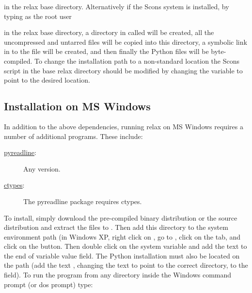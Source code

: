 
in the relax base directory.
Alternatively if the Scons system is installed, by typing as the root user


in the relax base directory, a directory in  called  will be created, all the uncompressed and untarred files will be copied into this directory, a symbolic link in  to the file  will be created, and then finally the Python  files will be byte-compiled.
To change the installation path to a non-standard location the Scons script  in the base relax directory should be modified by changing the variable  to point to the desired location.



\subsection{Installation on MS Windows}

In addition to the above dependencies, running relax on MS Windows requires a number of additional programs.
These include:
\begin{description}
  \item[\href{https://pypi.python.org/pypi/pyreadline}{pyreadline}:]  Any version.
  \item[\href{http://starship.python.net/crew/theller/ctypes/}{ctypes}:]  The pyreadline package requires ctypes.
\end{description}

To install, simply download the pre-compiled binary distribution  or the source distribution  and extract the files to .
Then add this directory to the system environment path (in Windows XP, right click on , go to , click on the  tab, and click on the  button.
Then double click on the  system variable and add the text  to the end of variable value field.
The Python installation must also be located on the path (add the text , changing the text to point to the correct directory, to the field).
To run the program from any directory inside the Windows command prompt (or dos prompt) type:

